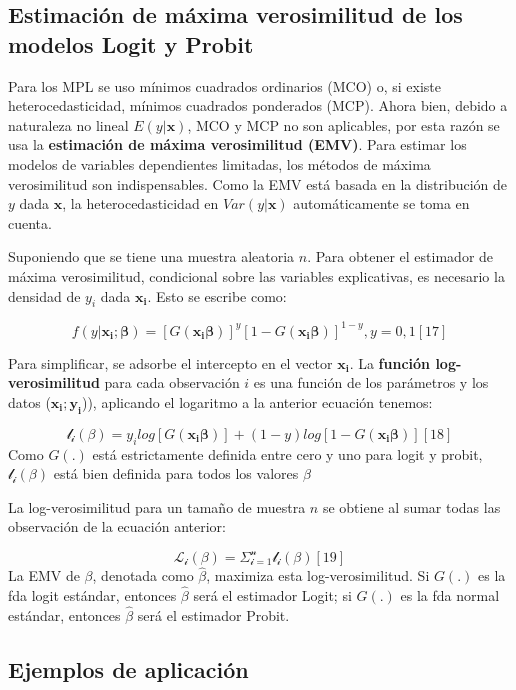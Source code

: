 \documentclass[
  letterpaper,
  DIV=11,
  numbers=noendperiod]{scrreprt}
\begin{document}
\subsection{Estimación de máxima verosimilitud de los modelos Logit y
Probit}\label{estimaciuxf3n-de-muxe1xima-verosimilitud-de-los-modelos-logit-y-probit}

Para los MPL se uso mínimos cuadrados ordinarios (MCO) o, si existe
heterocedasticidad, mínimos cuadrados ponderados (MCP). Ahora bien,
debido a naturaleza no lineal \(E(y|\mathbf{x})\), MCO y MCP no son
aplicables, por esta razón se usa la \textbf{estimación de máxima
verosimilitud (EMV)}. Para estimar los modelos de variables dependientes
limitadas, los métodos de máxima verosimilitud son indispensables. Como
la EMV está basada en la distribución de \(y\) dada \(\mathbf{x}\), la
heterocedasticidad en \(Var(y|\mathbf{x})\) automáticamente se toma en
cuenta.

Suponiendo que se tiene una muestra aleatoria \(n\). Para obtener el
estimador de máxima verosimilitud, condicional sobre las variables
explicativas, es necesario la densidad de \(y_i\) dada \(\mathbf{x_i}\).
Esto se escribe como:

\[f(y|\mathbf{x_i;\beta})=[G(\mathbf{x_i\beta})]^y[1-G(\mathbf{x_i\beta})]^{1-y},y=0,1 [17]\]

Para simplificar, se adsorbe el intercepto en el vector
\(\mathbf{x_i}\). La \textbf{función log-verosimilitud} para cada
observación \(i\) es una función de los parámetros y los datos
(\(\mathbf{x_i;y_i}\))), aplicando el logaritmo a la anterior ecuación
tenemos:

\[\mathcal{l_i(\beta)}=y_ilog[G(\mathbf{x_i\beta})]+(1-y)log[1-G(\mathbf{x_i\beta})] [18]\]
Como \(G(.)\) está estrictamente definida entre cero y uno para logit y
probit, \(\mathcal{l_i(\beta)}\) está bien definida para todos los
valores \(\beta\)

La log-verosimilitud para un tamaño de muestra \(n\) se obtiene al sumar
todas las observación de la ecuación anterior:

\[\mathcal{L_i(\beta)=\Sigma_{i=1}^n}\mathcal{l_i(\beta)}[19]\] La EMV
de \(\beta\), denotada como \(\widehat{\beta}\), maximiza esta
log-verosimilitud. Si \(G(.)\) es la fda logit estándar, entonces
\(\widehat{\beta}\) será el estimador Logit; si \(G(.)\) es la fda
normal estándar, entonces \(\widehat{\beta}\) será el estimador Probit.

\subsection{Ejemplos de aplicación}\label{ejemplos-de-aplicaciuxf3n}
\end{document}
